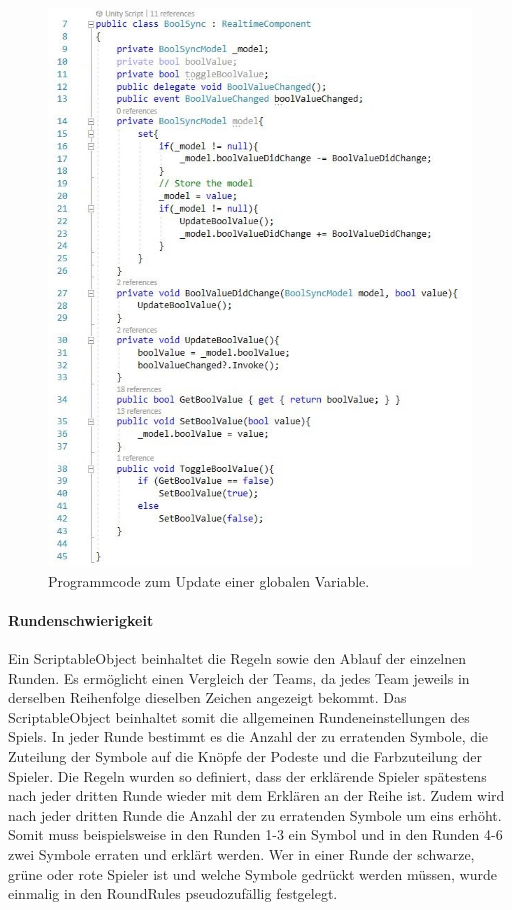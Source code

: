 \documentclass[a4paper,11pt]{article}%
\renewcommand{\\}{\vspace*{0.5\baselineskip} \newline}
\begin{document}
\begin{figure}[H]
		\begin{footnotesize}
			\includegraphics[scale=.75]{Abbildungen/boolValueChanged.jpg}
			\caption[Update von globalen Variablen]{Programmcode zum Update einer globalen Variable.}
			\label{boolSync}
		\end{footnotesize}
	\end{figure}

\paragraph{Rundenschwierigkeit}
Ein ScriptableObject beinhaltet die Regeln sowie den Ablauf der einzelnen Runden. Es ermöglicht einen Vergleich der Teams, da jedes Team jeweils in derselben Reihenfolge dieselben Zeichen angezeigt bekommt. Das ScriptableObject beinhaltet somit die allgemeinen Rundeneinstellungen des Spiels. In jeder Runde bestimmt es die Anzahl der zu erratenden Symbole, die Zuteilung der Symbole auf die Knöpfe der Podeste und die Farbzuteilung der Spieler. Die Regeln wurden so definiert, dass der erklärende Spieler spätestens nach jeder dritten Runde wieder mit dem Erklären an der Reihe ist. Zudem wird nach jeder dritten Runde die Anzahl der zu erratenden Symbole um eins erhöht. Somit muss beispielsweise in den Runden 1-3 ein Symbol und in den Runden 4-6 zwei Symbole erraten und erklärt werden. Wer in einer Runde der schwarze, grüne oder rote Spieler ist und welche Symbole gedrückt werden müssen, wurde einmalig in den RoundRules pseudozufällig festgelegt.
\end{document}
